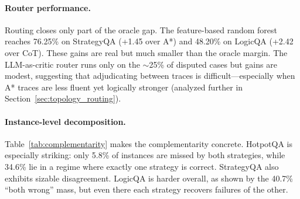 \documentclass[11pt]{article}
\begin{document}
\paragraph{Router performance.}
Routing closes only part of the oracle gap. The feature-based random forest reaches 76.25\% on StrategyQA (+1.45 over A*) and 48.20\% on LogicQA (+2.42 over CoT). These gains are real but much smaller than the oracle margin. The LLM-as-critic router runs only on the $\sim$25\% of disputed cases but gains are modest, suggesting that adjudicating between traces is difficult---especially when A* traces are less fluent yet logically stronger (analyzed further in Section~\ref{sec:topology_routing}).

\begin{table}[h]
\centering
\small
{}
\caption{Instance-level complementarity decomposition. ``CoT only'' means CoT is correct and A* is wrong; ``A* only'' means the reverse.}
\label{tab:complementarity}
\end{table}

\paragraph{Instance-level decomposition.}
Table~\ref{tab:complementarity} makes the complementarity concrete. HotpotQA is especially striking: only 5.8\% of instances are missed by both strategies, while 34.6\% lie in a regime where exactly one strategy is correct. StrategyQA also exhibits sizable disagreement. LogicQA is harder overall, as shown by the 40.7\% ``both wrong'' mass, but even there each strategy recovers failures of the other.
\end{document}
